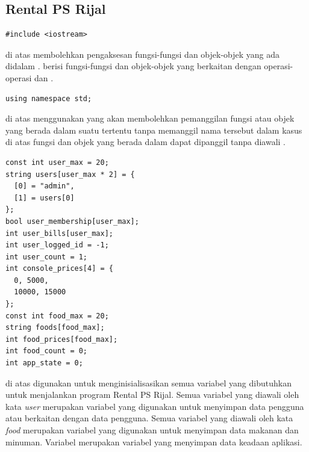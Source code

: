 \documentclass[../main.tex]{subfiles}
\begin{document}
\subsection{Rental PS Rijal}
\begin{code}
\begin{verbatim}
#include <iostream>
\end{verbatim}
\end{code}

{\Script} di atas membolehkan pengaksesan fungsi-fungsi dan objek-objek yang ada didalam {\header} {\file} . {\Header} {\file}  berisi fungsi-fungsi dan objek-objek yang berkaitan dengan operasi-operasi {\ioi} dan {\ioo} {\stream}.

\begin{code}
\begin{verbatim}
using namespace std;
\end{verbatim}
\end{code}

{\Script} di atas menggunakan {\statement}  yang akan membolehkan pemanggilan fungsi atau objek yang berada dalam suatu  tertentu tanpa memanggil nama  tersebut dalam kasus di atas fungsi dan objek yang berada dalam  dapat dipanggil tanpa diawali .

\begin{code}
\begin{verbatim}
const int user_max = 20;
string users[user_max * 2] = {
  [0] = "admin",
  [1] = users[0]
};
bool user_membership[user_max];
int user_bills[user_max];
int user_logged_id = -1;
int user_count = 1;
int console_prices[4] = {
  0, 5000,
  10000, 15000
};
const int food_max = 20;
string foods[food_max];
int food_prices[food_max];
int food_count = 0;
int app_state = 0;
\end{verbatim}
\end{code}

{\Script} di atas digunakan untuk menginisialisasikan semua variabel yang dibutuhkan untuk menjalankan program Rental PS Rijal. Semua variabel yang diawali oleh kata \textit{user} merupakan variabel yang digunakan untuk menyimpan data pengguna atau berkaitan dengan data pengguna. Semua variabel yang diawali oleh kata \textit{food} merupakan variabel yang digunakan untuk menyimpan data makanan dan minuman. Variabel  merupakan variabel yang menyimpan data keadaan aplikasi.
\end{document}
